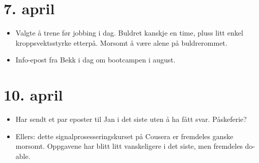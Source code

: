 \documentclass[11pt, norsk]{article}
\begin{document}

\section{7. april} %
\label{sec:7_april}

\begin{itemize}
  \item Valgte å trene før jobbing i dag. Buldret kanskje en time, pluss litt enkel kroppsvektsstyrke etterpå. Morsomt å være alene på buldrerommet.
  \item Info-epost fra Bekk i dag om bootcampen i august.
\end{itemize}


\section{10. april} %
\label{sec:10_april}

\begin{itemize}
  \item Har sendt et par eposter til Jan i det siste uten å ha fått svar. Påskeferie?
  \item Ellers: dette signalprosesseringskurset på Cousera er fremdeles ganske morsomt. Oppgavene har blitt litt vanskeligere i det siste, men fremdeles do-able.
\end{itemize}

\end{document}
